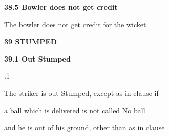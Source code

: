 \documentclass[12pt]{article}
\begin{document}
\vspace{\baselineskip}

\vspace{\baselineskip}
\begin{Center}
{\fontsize{8pt}{9.6pt}\par}
\end{Center}\par


\vspace{\baselineskip}
{\fontsize{11pt}{13.2pt}\selectfont \textbf{38.5 \tabto{0.47in} Bowler does not get credit}\par}\par


\vspace{\baselineskip}
{\fontsize{9pt}{10.8pt}\selectfont The bowler does not get credit for the wicket.\par}\par


\vspace{\baselineskip}
{\fontsize{16pt}{19.2pt}\selectfont \textbf{39 STUMPED}\par}\par


\vspace{\baselineskip}
{\fontsize{11pt}{13.2pt}\selectfont \textbf{39.1 \tabto{0.47in} Out Stumped}\par}\par


\vspace{\baselineskip}
{\fontsize{9pt}{10.8pt}.1 \tabto{0.49in} {\fontsize{8pt}{9.6pt}\selectfont The striker is out Stumped, except as in clause if\par}\par}\par


\vspace{\baselineskip}
\begin{adjustwidth}{0.5in}{0.0in}
{\fontsize{9pt}{10.8pt}\selectfont a ball which is delivered is not called No ball\par}\par

\end{adjustwidth}


\vspace{\baselineskip}
\begin{adjustwidth}{0.5in}{0.0in}
{\fontsize{9pt}{10.8pt}\selectfont and he is out of his ground, other than as in clause \par}\par

\end{adjustwidth}
\end{document}
